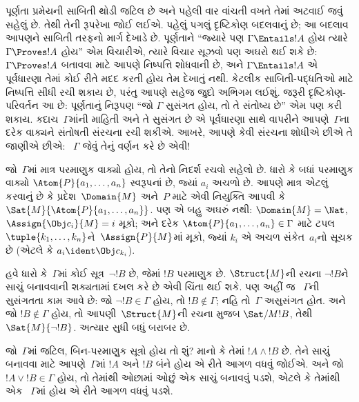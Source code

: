 \begingroup
\makeatletter{}\makeatother


\label{guunit:OLP-0128}


પૂર્ણતા પ્રમેયની સાબિતી થોડી જટિલ છે અને પહેલી વાર વાંચતી વખતે તેમાં
અટવાઈ જવું સહેલું છે. તેથી તેની રૂપરેખા જોઈ લઈએ. પહેલું પગલું
દૃષ્ટિકોણ બદલવાનું છે; આ બદલાવ આપણને સાબિતી તરફનો માર્ગ દેખાડે છે.
પૂર્ણતાને ``જ્યારે પણ $\Gamma \Entails !A$ હોય ત્યારે $\Gamma \Proves
!A$ હોય'' એમ વિચારીએ, ત્યારે વિચાર સૂઝવો પણ અઘરો થઈ શકે છે: $\Gamma
\Proves !A$ બતાવવા માટે આપણે નિષ્પત્તિ શોધવાની છે, અને $\Gamma
\Entails !A$ એ પૂર્વધારણા તેમાં કોઈ રીતે મદદ કરતી હોય તેમ દેખાતું નથી.
કેટલીક સાબિતી-પદ્ધતિઓ માટે નિષ્પત્તિ સીધી રચી શકાય છે, પરંતુ
આપણે સહેજ જુદો અભિગમ લઈશું. જરૂરી દૃષ્ટિકોણ-પરિવર્તન આ છે: પૂર્ણતાનું
નિરૂપણ ``જો $\Gamma$ સુસંગત હોય, તો તે સંતોષ્ય છે'' એમ પણ કરી શકાય.
કદાચ~$\Gamma$માંની માહિતી અને તે સુસંગત છે એ પૂર્વધારણા સાથે વાપરીને
આપણે~$\Gamma$ના દરેક વાક્યને સંતોષતી
સંરચના રચી શકીએ. આખરે, આપણે કેવી
સંરચના શોધીએ છીએ તે જાણીએ છીએ:
~$\Gamma$ જેવું તેનું વર્ણન કરે છે એવી!{}

જો~$\Gamma$માં માત્ર પરમાણુક
  વાક્યો હોય, તો તેનો નિદર્શ રચવો
સહેલો છે. ધારો કે બધાં પરમાણુક વાક્યો
  $\Atom{P}{a_1,\dots,a_n}$ સ્વરૂપનાં છે, જ્યાં $a_i$ અચળો
  છે. આપણે માત્ર એટલું કરવાનું છે કે
%
  પ્રદેશ~$\Domain{M}$ અને~$P$ માટે એવી નિયુક્તિ આપવી કે
  $\Sat{M}{\Atom{P}{a_1,\ldots,a_n}}$. પણ એ બહુ અઘરું નથી:
  $\Domain{M} = \Nat$, $\Assign{\Obj c_i}{M} = i$ મૂકો; અને દરેક
  $\Atom{P}{a_1,\ldots,a_n} \in \Gamma$ માટે ટપલ
  $\tuple{k_1,\dots,k_n}$ને~$\Assign{P}{M}$માં મૂકો, જ્યાં $k_i$ એ
  અચળ સંકેત~$a_i$નો સૂચક છે (એટલે કે $a_i \ident \Obj c_{k_i}$).

હવે ધારો કે~$\Gamma$માં કોઈ સૂત્ર~$\lnot !B$ છે, જેમાં $!B$
પરમાણુક છે. $\Struct{M}$ની રચના $\lnot !B$ને
સાચું બનાવવાની શક્યતામાં દખલ કરે છે એવી ચિંતા થઈ શકે. પણ અહીં જ
~$\Gamma$ની સુસંગતતા કામ આવે છે: જો $\lnot !B \in \Gamma$ હોય, તો
$!B \notin \Gamma$; નહિ તો~$\Gamma$ અસુસંગત હોત. અને જો $!B \notin
\Gamma$ હોય, તો આપણી~$\Struct{M}$ની રચના મુજબ
$\Sat/{M}{!B}$, તેથી
$\Sat{M}{\lnot !B}$. અત્યાર સુધી બધું બરાબર છે.

જો~$\Gamma$માં જટિલ, બિન-પરમાણુક સૂત્રો હોય તો શું? માનો કે તેમાં
$!A \land !B$ છે. તેને સાચું બનાવવા માટે આપણે~$\Gamma$માં $!A$ અને
$!B$ બંને હોય એ રીતે આગળ વધવું જોઈએ. અને જો $!A \lor !B \in \Gamma$
હોય, તો તેમાંથી ઓછામાં ઓછું એક સાચું બનાવવું પડશે, એટલે કે તેમાંથી એક
~$\Gamma$માં હોય એ રીતે આગળ વધવું પડશે.

